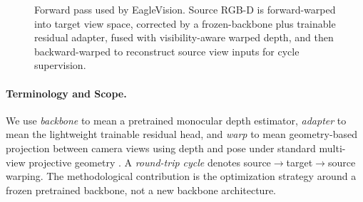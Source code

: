 \documentclass{article}
\begin{document}
\begin{figure}[t]
{%
}
\caption{Forward pass used by EagleVision. Source RGB-D is forward-warped into target view space, corrected by a frozen-backbone plus trainable residual adapter, fused with visibility-aware warped depth, and then backward-warped to reconstruct source view inputs for cycle supervision.}
\label{fig:eaglevision_block}
\end{figure}

\paragraph{Terminology and Scope.}
We use \emph{backbone} to mean a pretrained monocular depth estimator, \emph{adapter} to mean the lightweight trainable residual head, and \emph{warp} to mean geometry-based projection between camera views using depth and pose under standard multi-view projective geometry \cite{hartley2003multiple}. A \emph{round-trip cycle} denotes source$\rightarrow$target$\rightarrow$source warping. The methodological contribution is the optimization strategy around a frozen pretrained backbone, not a new backbone architecture.
\end{document}
